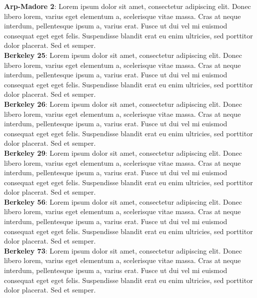 \documentclass{aa}
\begin{document}
 \noindent\textbf{Arp-Madore 2}: Lorem ipsum dolor sit amet, consectetur adipiscing elit. Donec libero lorem, varius eget elementum a, scelerisque vitae massa. Cras at neque interdum, pellentesque ipsum a, varius erat. Fusce ut dui vel mi euismod consequat eget eget felis. Suspendisse blandit erat eu enim ultricies, sed porttitor dolor placerat. Sed et semper.\\

 \noindent\textbf{Berkeley 25}: Lorem ipsum dolor sit amet, consectetur adipiscing elit. Donec libero lorem, varius eget elementum a, scelerisque vitae massa. Cras at neque interdum, pellentesque ipsum a, varius erat. Fusce ut dui vel mi euismod consequat eget eget felis. Suspendisse blandit erat eu enim ultricies, sed porttitor dolor placerat. Sed et semper.\\

 \noindent\textbf{Berkeley 26}: Lorem ipsum dolor sit amet, consectetur adipiscing elit. Donec libero lorem, varius eget elementum a, scelerisque vitae massa. Cras at neque interdum, pellentesque ipsum a, varius erat. Fusce ut dui vel mi euismod consequat eget eget felis. Suspendisse blandit erat eu enim ultricies, sed porttitor dolor placerat. Sed et semper.\\

 \noindent\textbf{Berkeley 29}: Lorem ipsum dolor sit amet, consectetur adipiscing elit. Donec libero lorem, varius eget elementum a, scelerisque vitae massa. Cras at neque interdum, pellentesque ipsum a, varius erat. Fusce ut dui vel mi euismod consequat eget eget felis. Suspendisse blandit erat eu enim ultricies, sed porttitor dolor placerat. Sed et semper.\\

 \noindent\textbf{Berkeley 56}: Lorem ipsum dolor sit amet, consectetur adipiscing elit. Donec libero lorem, varius eget elementum a, scelerisque vitae massa. Cras at neque interdum, pellentesque ipsum a, varius erat. Fusce ut dui vel mi euismod consequat eget eget felis. Suspendisse blandit erat eu enim ultricies, sed porttitor dolor placerat. Sed et semper.\\

 \noindent\textbf{Berkeley 73}: Lorem ipsum dolor sit amet, consectetur adipiscing elit. Donec libero lorem, varius eget elementum a, scelerisque vitae massa. Cras at neque interdum, pellentesque ipsum a, varius erat. Fusce ut dui vel mi euismod consequat eget eget felis. Suspendisse blandit erat eu enim ultricies, sed porttitor dolor placerat. Sed et semper.\\
\end{document}
